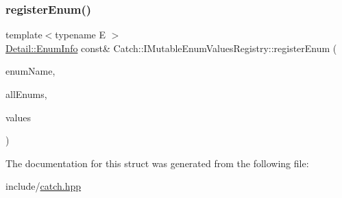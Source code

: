 \subsubsection{\texorpdfstring{registerEnum()}{registerEnum()}\hspace{0.1cm}{\footnotesize\ttfamily [2/2]}}
{\footnotesize\ttfamily template$<$typename E $>$ \\
\mbox{\hyperlink{struct_catch_1_1_detail_1_1_enum_info}{Detail\+::\+Enum\+Info}} const\& Catch\+::\+I\+Mutable\+Enum\+Values\+Registry\+::register\+Enum (\begin{DoxyParamCaption}\item[{\mbox{\hyperlink{class_catch_1_1_string_ref}{String\+Ref}}}]{enum\+Name,  }\item[{\mbox{\hyperlink{class_catch_1_1_string_ref}{String\+Ref}}}]{all\+Enums,  }\item[{std\+::initializer\+\_\+list$<$ E $>$}]{values }\end{DoxyParamCaption})\hspace{0.3cm}{\ttfamily [inline]}}



The documentation for this struct was generated from the following file\+:\begin{DoxyCompactItemize}
\item 
include/\mbox{\hyperlink{catch_8hpp}{catch.\+hpp}}\end{DoxyCompactItemize}
